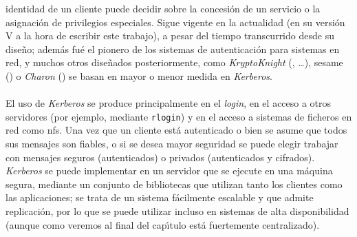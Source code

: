 identidad de un cliente puede decidir sobre la concesi\'on de un servicio o la 
asignaci\'on de privilegios especiales. Sigue vigente en la actualidad (en su
versi\'on V a la hora de escribir este trabajo), a pesar del tiempo 
transcurrido desde su dise\~no; adem\'as fu\'e el pionero de los sistemas 
de autenticaci\'on para sistemas en red, y muchos otros dise\~nados 
posteriormente, como {\it 
KryptoKnight} (\cite{kn:mol92}, \cite{kn:jan97}\dots), {\sc sesame} 
(\cite{kn:pin93}) o {\it Charon} (\cite{kn:atk93}) se basan en mayor o menor 
medida en {\it Kerberos}.\\
\\El uso de {\it Kerberos} se produce principalmente en el {\it login}, en el 
acceso a otros servidores (por ejemplo, mediante {\tt rlogin}) y en el acceso
a sistemas de ficheros en red como {\sc nfs}. Una vez que un cliente est\'a
autenticado o bien se asume que todos sus mensajes son fiables, o si se desea
mayor seguridad se
puede elegir trabajar con mensajes seguros (autenticados) o privados
(autenticados y cifrados). {\it Kerberos} se puede implementar en un 
servidor que se ejecute en una m\'aquina segura, mediante un conjunto de 
bibliotecas que utilizan tanto los clientes como las aplicaciones; se trata de
un sistema
f\'acilmente escalable y que admite replicaci\'on, por lo que se puede utilizar
incluso en sistemas de alta disponibilidad (aunque como veremos al final del
cap\'{\i}tulo est\'a fuertemente centralizado).
